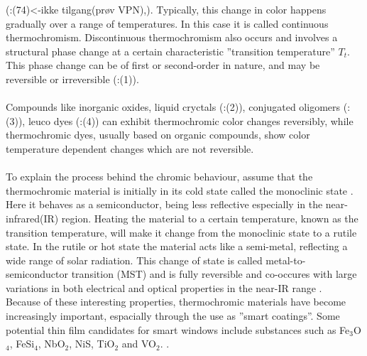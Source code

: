 (\cite{Kamalisarvestani2013}:(74)<-ikke tilgang(prøv VPN),\cite{Parkin2006}). 
\cite{White1999}
Typically, this change in color happens gradually over a range of temperatures. In this case it is called
continuous thermochromism. Discontinuous thermochromism also occurs and involves a structural
phase change at a certain characteristic ''transition temperature'' $T_t$. This phase
change can be of first or second-order in nature, and may be reversible or irreversible (\cite{Kiri2010}:(1)). 
\\
\\
Compounds like inorganic oxides, liquid cryctals (\cite{Kiri2010}:(2)), 
conjugated oligomers (\cite{Kiri2010}:(3)), leuco dyes (\cite{Kiri2010}:(4)) can exhibit thermochromic 
color changes reversibly, while thermochromic dyes, usually based on organic 
compounds, show color temperature dependent changes which are not reversible.
\\
\\
To explain the process behind the chromic behaviour, assume that the thermochromic material is initially 
in its cold state called the monoclinic state . 
Here it behaves as a semiconductor, being less reflective especially in the near-infrared(IR) region. 
Heating the material to a certain temperature, known as the transition temperature, 
will make it change from the monoclinic state to a 
rutile state. In the rutile or hot state the material acts like a semi-metal, reflecting 
a wide range of solar radiation. This change of state is called metal-to-semiconductor
transition (MST) \cite[p.~4565]{Blackman2009} and is fully reversible 
and co-occures with large variations in both electrical and optical properties in the near-IR range 
\cite{Morin1959}. 
\\
Because of these interesting properties, thermochromic materials have become increasingly important,
espacially through the use as ''smart coatings''.
Some potential thin film candidates for smart windows include substances such as
Fe$_3$O$_4$, FeSi$_4$, NbO$_2$, NiS, TiO$_2$ and VO$_2$. \cite{White1999}.






